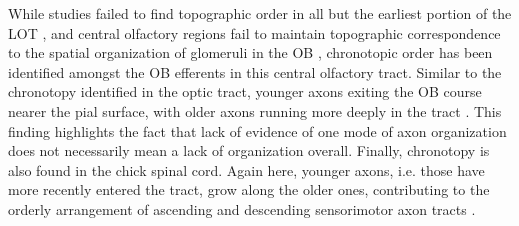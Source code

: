 \label{sec:LOT}
While studies failed to find topographic order in all but the earliest portion of the LOT \cite{price1975observation}, and central olfactory regions fail to maintain topographic correspondence to the spatial organization of glomeruli in the OB \cite{luskin1982distribution,sosulski2011distinct}, chronotopic order has been identified amongst the OB efferents in this central olfactory tract.
Similar to the chronotopy identified in the optic tract, younger axons exiting the OB course nearer the pial surface, with older axons running more deeply in the tract \cite{yamatani2004chronotopic}. 
This finding highlights the fact that lack of evidence of one mode of axon organization does not necessarily mean a lack of organization overall.
Finally, chronotopy is also found in the chick spinal cord.
Again here, younger axons, i.e. those have more recently entered the tract, grow along the older ones, contributing to the orderly arrangement of ascending and descending sensorimotor axon tracts \cite{nornes1980pattern}.